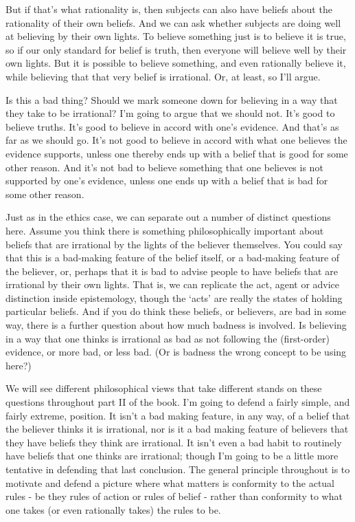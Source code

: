 But if that's what rationality is, then subjects can also have beliefs about the rationality of their own beliefs. And we can ask whether subjects are doing well at believing by their own lights. To believe something just is to believe it is true, so if our only standard for belief is truth, then everyone will believe well by their own lights. But it is possible to believe something, and even rationally believe it, while believing that that very belief is irrational. Or, at least, so I'll argue.

Is this a bad thing? Should we mark someone down for believing in a way that they take to be irrational? I'm going to argue that we should not. It's good to believe truths. It's good to believe in accord with one's evidence. And that's as far as we should go. It's not good to believe in accord with what one believes the evidence supports, unless one thereby ends up with a belief that is good for some other reason. And it's not bad to believe something that one believes is not supported by one's evidence, unless one ends up with a belief that is bad for some other reason.

Just as in the ethics case, we can separate out a number of distinct questions here. Assume you think there is something philosophically important about beliefs that are irrational by the lights of the believer themselves. You could say that this is a bad-making feature of the belief itself, or a bad-making feature of the believer, or, perhaps that it is bad to advise people to have beliefs that are irrational by their own lights. That is, we can replicate the act, agent or advice distinction inside epistemology, though the `acts' are really the states of holding particular beliefs. And if you do think these beliefs, or believers, are bad in some way, there is a further question about how much badness is involved. Is believing in a way that one thinks is irrational as bad as not following the (first-order) evidence, or more bad, or less bad. (Or is badness the wrong concept to be using here?)

We will see different philosophical views that take different stands on these questions throughout part II of the book. I'm going to defend a fairly simple, and fairly extreme, position. It isn't a bad making feature, in any way, of a belief that the believer thinks it is irrational, nor is it a bad making feature of believers that they have beliefs they think are irrational. It isn't even a bad habit to routinely have beliefs that one thinks are irrational; though I'm going to be a little more tentative in defending that last conclusion. The general principle throughout is to motivate and defend a picture where what matters is conformity to the actual rules - be they rules of action or rules of belief - rather than conformity to what one takes (or even rationally takes) the rules to be.

